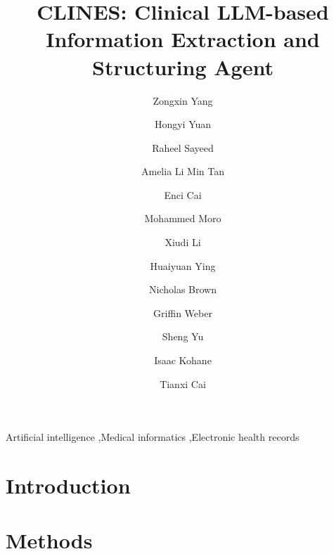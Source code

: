 \documentclass[review,12pt,times,nopreprintline]{elsarticle}
\begin{document}
\begin{frontmatter}

\title{CLINES: Clinical LLM-based Information Extraction and Structuring Agent}

\author[1]{Zongxin Yang}
\author[3]{Hongyi Yuan}
\author[1]{Raheel Sayeed}
\author[1]{Amelia Li Min Tan}
\author[1]{Enci Cai}
\author[1]{Mohammed Moro}
\author[4]{Xiudi Li}
\author[3]{Huaiyuan Ying}
\author[6]{Nicholas Brown}
\author[5,6]{Griffin Weber}
\author[3]{Sheng Yu}
\author[1]{Isaac Kohane}
\author[1,2]{Tianxi Cai}

\address[1]{Department of Biomedical Informatics, Harvard Medical School, Boston, MA, USA}
\address[2]{Harvard T.H. Chan School of Public Health, Boston, MA, USA}
\address[3]{Department of Statistics and Data Science, Tsinghua University, Beijing, China}
\address[4]{Division of Biostatistics, University of California Berkeley, Berkeley, CA, USA}
\address[5]{Division of Interdisciplinary Medicine and Biotechnology, Department of Medicine, Beth Israel Deaconess Medical Center, Boston, MA, USA}
\address[6]{Harvard Medical School, Boston, MA, USA}


\begin{abstract}

\end{abstract}

\begin{keyword}
Artificial intelligence \sep Medical informatics \sep Electronic health records
\end{keyword}

\end{frontmatter}




\section{Introduction}


\section{Methods}

\end{document}
